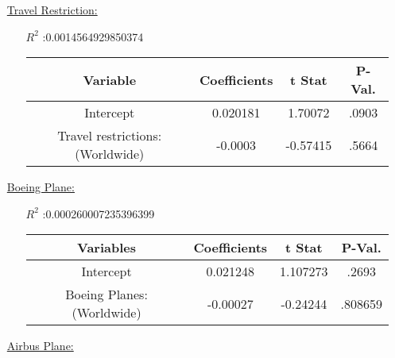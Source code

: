 \documentclass[12pt]{report}
\begin{document}
\begin{enumerate}

 \setlength{\itemsep}{1.5cm}

    \item[\underline{Travel Restriction:}]
        \begin{enumerate}
            \item[$R^2$]:0.0014564929850374
            \item[]
                \begin{tabular}{|c|c|c|c|}
                          \toprule \hline
                          \textbf{Variable} & \textbf{Coefficients} & \textbf{t Stat} & \textbf{P-Val.}\\ \hline
                          Intercept & 0.020181 & 1.70072 &.0903 \\ \hline
                          Travel restrictions:(Worldwide) & -0.0003 & -0.57415 &.5664 \\ \hline
                          \bottomrule





                \end{tabular}




        \end{enumerate}

    \item[\underline{Boeing Plane:}]
        \begin{enumerate}
            \item[$R^2$]:0.000260007235396399
            \item[]
                 \begin{tabular}{|c|c|c|c|}

        \toprule \hline
        \textbf{Variables} & \textbf{Coefficients}  & \textbf{t Stat}& \textbf{P-Val.} \\ \hline

        Intercept & 0.021248 &  1.107273 &.2693 \\ \hline
        Boeing Planes: (Worldwide) & -0.00027 &  -0.24244 &.808659\\ \hline
        \bottomrule

                \end{tabular}




        \end{enumerate}

    \item[\underline{Airbus Plane:}]
 \begin{samepage}


\end{samepage}
\end{enumerate}
\end{document}
